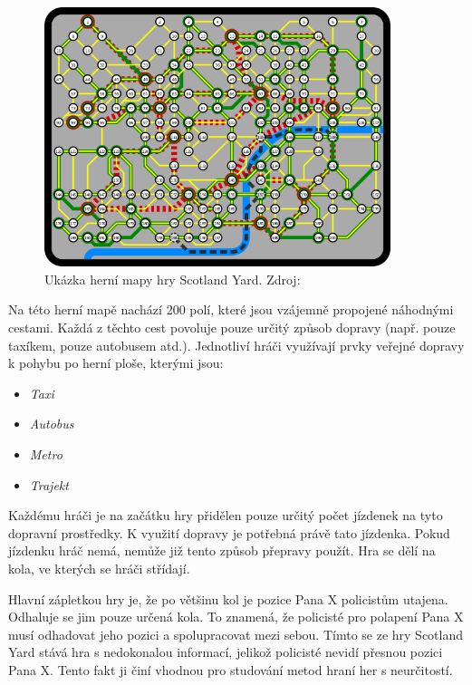 \begin{figure}[H]
	\centering
	\includegraphics[width=0.9\textwidth]{obrazky-figures/scotland_original}
	\caption{Ukázka herní mapy hry Scotland Yard.
  Zdroj: \cite{scotland_original_image}}\label{fig:figure}
\end{figure}
\newpage

Na této herní mapě nachází 200 polí, které jsou vzájemně propojené náhodnými cestami.
Každá z těchto cest povoluje pouze určitý způsob dopravy (např. pouze taxíkem, pouze autobusem atd.).
Jednotliví hráči využívají prvky veřejné dopravy k pohybu po herní ploše, kterými jsou:

\begin{itemize}
  \item \emph{Taxi}\vspace{-0.3cm}
  \item \emph{Autobus}\vspace{-0.3cm}
  \item \emph{Metro}\vspace{-0.3cm}
  \item \emph{Trajekt}\vspace{-0.3cm}
\end{itemize}


Každému hráči je na začátku hry přidělen pouze určitý počet jízdenek na tyto dopravní prostředky.
K využití dopravy je potřebná právě tato jízdenka.
Pokud jízdenku hráč nemá, nemůže již tento způsob přepravy použít.
Hra se dělí na kola, ve kterých se hráči střídají.

Hlavní zápletkou hry je, že po většinu kol je pozice Pana X policistům utajena.
Odhaluje se jim pouze určená kola.
To znamená, že policisté pro polapení Pana X musí odhadovat jeho pozici a spolupracovat mezi sebou.
Tímto se ze hry Scotland Yard stává hra s nedokonalou informací, jelikož policisté nevidí přesnou pozici Pana X\@.
Tento fakt ji činí vhodnou pro studování metod hraní her s neurčitostí.

